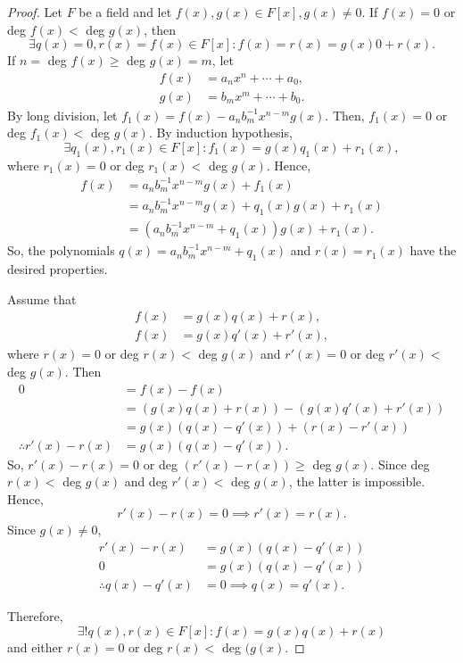 \documentclass{article}
\theoremstyle{definition}
\begin{document}
\begin{proof}
      Let $F$ be a field and let $f(x),g(x)\in F[x], g(x)\neq0$. If $f(x)=0$ or deg $f(x)<$ deg $g(x)$, then
      \begin{equation*}
          \exists q(x)=0, r(x)=f(x)\in F[x]: f(x)=r(x)=g(x)0+r(x).
      \end{equation*}
      If $n=$ deg $f(x)\geq$ deg $g(x)=m$, let
      \begin{align*}
          f(x)&=a_nx^n+\cdots+a_0, \\ g(x)&=b_mx^m+\cdots+b_0.
      \end{align*}
      By long division, let $f_1(x)=f(x)-a_nb_m^{-1}x^{n-m}g(x)$. Then, $f_1(x)=0$ or deg $f_1(x)<$ deg $g(x)$. By induction hypothesis,
      \begin{equation*}
          \exists q_1(x),r_1(x)\in F[x]: f_1(x)=g(x)q_1(x)+r_1(x),
      \end{equation*}
      where $r_1(x)=0$ or deg $r_1(x)<$ deg $g(x)$. Hence,
      \begin{align*}
          f(x)&=a_nb_m^{-1}x^{n-m}g(x)+f_1(x) \\
          &=a_nb_m^{-1}x^{n-m}g(x)+q_1(x)g(x)+r_1(x) \\
          &=(a_nb_m^{-1}x^{n-m}+q_1(x))g(x)+r_1(x).
      \end{align*}
      So, the polynomials $q(x)=a_nb_m^{-1}x^{n-m}+q_1(x)$ and $r(x)=r_1(x)$ have the desired properties.
      
      Assume that
      \begin{align*}
          f(x)&=g(x)q(x)+r(x), \\
          f(x)&=g(x)q'(x)+r'(x),
      \end{align*}
      where $r(x)=0$ or deg $r(x) <$ deg $g(x)$ and $r'(x)=0$ or deg $r'(x)<$ deg $g(x)$. Then
      \begin{align*}
          0&=f(x)-f(x) \\
          &=(g(x)q(x)+r(x))-(g(x)q'(x)+r'(x)) \\
          &=g(x)(q(x)-q'(x))+(r(x)-r'(x)) \\
          \therefore r'(x)-r(x) &= g(x)(q(x)-q'(x)).
      \end{align*}
      So, $r'(x)-r(x)=0$ or deg $(r'(x)-r(x)) \geq$ deg $g(x)$. Since deg $r(x) <$ deg $g(x)$ and deg $r'(x)<$ deg $g(x)$, the latter is impossible. Hence,
      \begin{equation*}
          r'(x)-r(x)=0 \implies r'(x)=r(x).
      \end{equation*}
      Since $g(x)\neq0$,
      \begin{align*}
          r'(x)-r(x) &= g(x)(q(x)-q'(x)) \\
          0 &= g(x)(q(x)-q'(x)) \\
          \therefore q(x)-q'(x)&=0 \implies q(x)=q'(x).
      \end{align*}
      
      Therefore,
      \begin{equation*}
        \exists! q(x),r(x)\in F[x]: f(x)=g(x)q(x)+r(x)
      \end{equation*}
      and either $r(x)=0$ or deg $r(x) < $ deg $(g(x)$.
\end{proof}
\end{document}
